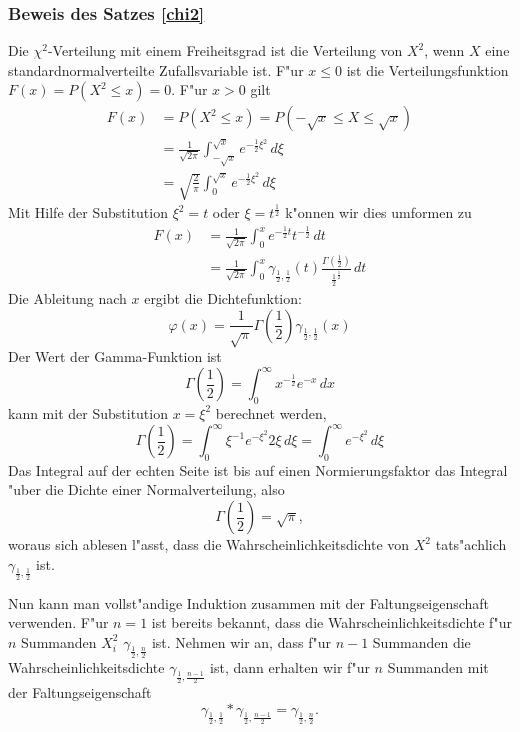 {\subsubsection{Beweis des Satzes \ref{chi2}}
Die $\chi^2$-Verteilung mit einem Freiheitsgrad ist die Verteilung von
$X^2$, wenn $X$ eine standardnormalverteilte Zufallsvariable ist.
F"ur $x\le 0$ ist die Verteilungsfunktion $F(x)=P(X^2\le x)=0$. 
F"ur $x>0$ gilt
\begin{align*}
F(x)&=P(X^2\le x)=P(-\sqrt{x}\le X\le\sqrt{x})\\
&=\frac1{\sqrt{2\pi}}\int_{-\sqrt{x}}^{\sqrt{x}}e^{-\frac12 \xi^2}\,d\xi\\
&=\sqrt{\frac{2}{\pi}}\int_0^{\sqrt{x}}e^{-\frac12\xi^2}\,d\xi
\end{align*}
Mit Hilfe der Substitution $\xi^2=t$ oder $\xi=t^{\frac12}$ k"onnen wir
dies umformen zu
\begin{align*}
F(x)&=\frac1{\sqrt{2\pi}}\int_0^xe^{-\frac12t}t^{-\frac12}\,dt\\
&=\frac1{\sqrt{2\pi}}\int_0^x\gamma_{\frac12,\frac12}(t)
\frac{\Gamma(\frac12)}{{\frac12}^{\frac12}}\,dt
\end{align*}
Die Ableitung nach $x$ ergibt die Dichtefunktion:
\[
\varphi(x)=\frac1{\sqrt{\pi}}\Gamma({\textstyle\frac12})\gamma_{\frac12,\frac12}(x)
\]
Der Wert der Gamma-Funktion ist
\[
\Gamma({\textstyle\frac12})
=\int_0^\infty x^{-\frac12}e^{-x}\,dx
\]
kann mit der Substitution $x=\xi^2$ berechnet werden,
\[
\Gamma({\textstyle\frac12})=\int_0^\infty \xi^{-1}e^{-\xi^2}2\xi\,d\xi
=\int_0^{\infty}e^{-\xi^2}\,d\xi
\]
Das Integral auf der echten Seite ist bis auf einen Normierungsfaktor
das Integral "uber die Dichte einer Normalverteilung, also
\[
\Gamma({\textstyle\frac12})=\sqrt{\pi},
\]
woraus sich ablesen l"asst, dass die Wahrscheinlichkeitsdichte 
von $X^2$ tats"achlich $\gamma_{\frac12,\frac12}$ ist.

Nun kann man vollst"andige Induktion zusammen mit der Faltungseigenschaft
verwenden. F"ur $n=1$ ist bereits bekannt, dass die Wahrscheinlichkeitsdichte
f"ur $n$ Summanden $X_i^2$ $\gamma_{\frac12,\frac{n}2}$ ist. Nehmen wir an,
dass f"ur $n-1$ Summanden die Wahrscheinlichkeitsdichte
$\gamma_{\frac12,\frac{n-1}2}$
ist, dann erhalten wir f"ur $n$ Summanden mit der Faltungseigenschaft
\[
\gamma_{\frac12,\frac12}*\gamma_{\frac12,\frac{n-1}2}=\gamma_{\frac12,\frac{n}2}.
\]

}
